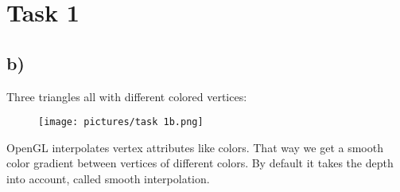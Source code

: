 \section{Task 1}
\subsection{b)}
Three triangles all with different colored vertices:
\begin{figure}[h!]
    \centering
    \texttt{[image: pictures/task 1b.png]}
\end{figure}

OpenGL interpolates vertex attributes like colors. That way we get a smooth color gradient between vertices of different colors. By default it takes the depth into account, called smooth interpolation. 

